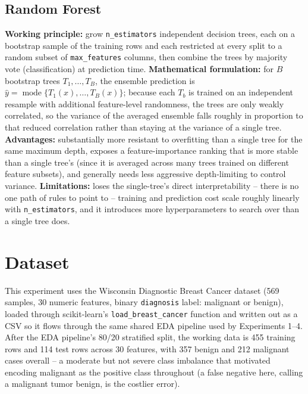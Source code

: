 \documentclass[11pt,a4paper]{article}
\begin{document}
\subsection{Random Forest}
\textbf{Working principle:} grow \texttt{n\_estimators} independent decision trees, each on a bootstrap sample of the training rows and each restricted at every split to a random subset of \texttt{max\_features} columns, then combine the trees by majority vote (classification) at prediction time.
\textbf{Mathematical formulation:} for $B$ bootstrap trees $T_1,\dots,T_B$, the ensemble prediction is $\hat y = \operatorname{mode}\{T_1(x),\dots,T_B(x)\}$; because each $T_b$ is trained on an independent resample with additional feature-level randomness, the trees are only weakly correlated, so the variance of the averaged ensemble falls roughly in proportion to that reduced correlation rather than staying at the variance of a single tree.
\textbf{Advantages:} substantially more resistant to overfitting than a single tree for the same maximum depth, exposes a feature-importance ranking that is more stable than a single tree's (since it is averaged across many trees trained on different feature subsets), and generally needs less aggressive depth-limiting to control variance.
\textbf{Limitations:} loses the single-tree's direct interpretability -- there is no one path of rules to point to -- training and prediction cost scale roughly linearly with \texttt{n\_estimators}, and it introduces more hyperparameters to search over than a single tree does.

\section{Dataset}
This experiment uses the Wisconsin Diagnostic Breast Cancer dataset (569 samples, 30 numeric features, binary \texttt{diagnosis} label: malignant or benign), loaded through scikit-learn's \texttt{load\_breast\_cancer} function and written out as a CSV so it flows through the same shared EDA pipeline used by Experiments 1--4. After the EDA pipeline's 80/20 stratified split, the working data is 455 training rows and 114 test rows across 30 features, with 357 benign and 212 malignant cases overall -- a moderate but not severe class imbalance that motivated encoding malignant as the positive class throughout (a false negative here, calling a malignant tumor benign, is the costlier error).

\end{document}
